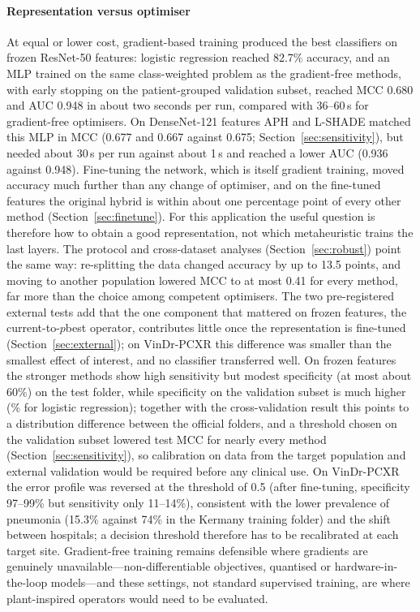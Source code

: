 \documentclass[preprint,12pt]{elsarticle}
\begin{document}
\paragraph{Representation versus optimiser} At equal or lower cost, gradient-based training produced the best classifiers on frozen ResNet-50 features: logistic regression reached 82.7\% accuracy, and an MLP trained on the same class-weighted problem as the gradient-free methods, with early stopping on the patient-grouped validation subset, reached MCC 0.680 and AUC 0.948 in about two seconds per run, compared with 36--60\,s for gradient-free optimisers. On DenseNet-121 features APH and L-SHADE matched this MLP in MCC (0.677 and 0.667 against 0.675; Section~\ref{sec:sensitivity}), but needed about 30\,s per run against about 1\,s and reached a lower AUC (0.936 against 0.948). Fine-tuning the network, which is itself gradient training, moved accuracy much further than any change of optimiser, and on the fine-tuned features the original hybrid is within about one percentage point of every other method (Section~\ref{sec:finetune}). For this application the useful question is therefore how to obtain a good representation, not which metaheuristic trains the last layers. The protocol and cross-dataset analyses (Section~\ref{sec:robust}) point the same way: re-splitting the data changed accuracy by up to 13.5 points, and moving to another population lowered MCC to at most 0.41 for every method, far more than the choice among competent optimisers. The two pre-registered external tests add that the one component that mattered on frozen features, the current-to-$p$best operator, contributes little once the representation is fine-tuned (Section~\ref{sec:external}); on VinDr-PCXR this difference was smaller than the smallest effect of interest, and no classifier transferred well. On frozen features the stronger methods show high sensitivity but modest specificity (at most about 60\%) on the test folder, while specificity on the validation subset is much higher (\LRValSpec\% for logistic regression); together with the cross-validation result this points to a distribution difference between the official folders, and a threshold chosen on the validation subset lowered test MCC for nearly every method (Section~\ref{sec:sensitivity}), so calibration on data from the target population and external validation would be required before any clinical use. On VinDr-PCXR the error profile was reversed at the threshold of 0.5 (after fine-tuning, specificity 97--99\% but sensitivity only 11--14\%), consistent with the lower prevalence of pneumonia (15.3\% against 74\% in the Kermany training folder) and the shift between hospitals; a decision threshold therefore has to be recalibrated at each target site. Gradient-free training remains defensible where gradients are genuinely unavailable---non-differentiable objectives, quantised or hardware-in-the-loop models---and these settings, not standard supervised training, are where plant-inspired operators would need to be evaluated.
\end{document}

